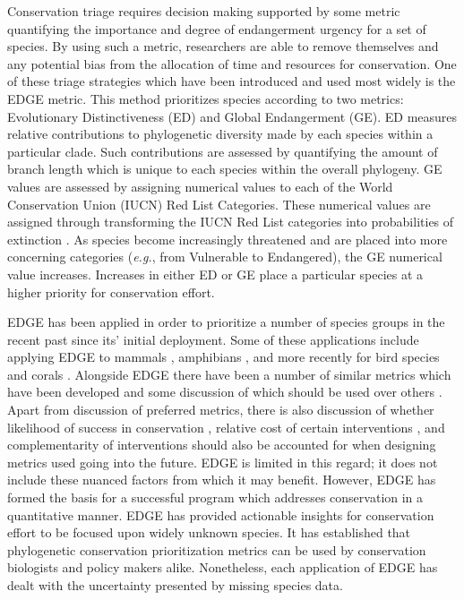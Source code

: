\documentclass[12pt,english]{article}
\begin{document}
Conservation triage requires decision making supported by some metric
quantifying the importance and degree of endangerment urgency for a set of
species. By using such a metric, researchers are able to remove themselves and
any potential bias from the allocation of time and resources for conservation.
One of these triage strategies which have been introduced and used most widely
is the EDGE metric\autocite[Evolutionary Distinction and Globally
Endangered;][]{Isaac2007}. This method prioritizes species according to two
metrics: Evolutionary Distinctiveness (ED) and Global Endangerment (GE). ED
measures relative contributions to phylogenetic diversity made by each species
within a particular clade\autocite{Isaac2007}. Such contributions are assessed
by quantifying the amount of branch length which is unique to each species
within the overall phylogeny. GE values are assessed by assigning numerical
values to each of the World Conservation Union (IUCN) Red List Categories. These
numerical values are assigned through transforming the IUCN Red List categories
into probabilities of extinction \autocite{Mooers2008}. As species become
increasingly threatened and are placed into more concerning categories
(\emph{e.g.}, from Vulnerable to Endangered), the GE numerical value increases.
Increases in either ED or GE place a particular species at a higher priority for
conservation effort.

EDGE has been applied in order to prioritize a number of species groups in the
recent past since its' initial deployment. Some of these applications include
applying EDGE to mammals \autocite{Isaac2007}, amphibians \autocite{Isaac2012},
and more recently for bird species \autocite{Jetz2014} and corals
\autocite{Curnick2015}. Alongside EDGE there have been a number of similar
metrics which have been developed and some discussion of which should be used
over others \autocite{Steel2007, Pearse2015}. Apart from discussion of preferred
metrics, there is also discussion of whether likelihood of success in
conservation \autocite{arg}, relative cost of certain interventions
\autocite{arg}, and complementarity of interventions \autocite{arg} should also
be accounted for when designing metrics used going into the future. EDGE is
limited in this regard; it does not include these nuanced factors from which it
may benefit. However, EDGE has formed the basis for a successful program which
addresses conservation in a quantitative manner. EDGE has provided actionable
insights for conservation effort to be focused upon widely unknown species. It
has established that phylogenetic conservation prioritization metrics can be
used by conservation biologists and policy makers alike. Nonetheless, each
application of EDGE has dealt with the uncertainty presented by missing species
data.
\end{document}
